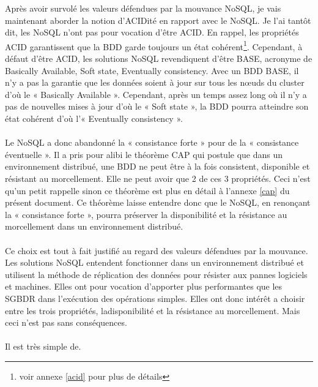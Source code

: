 Après avoir survolé les valeurs défendues par la mouvance \textsf{NoSQL}, je vais maintenant aborder la notion d'\textsf{ACIDité} en rapport avec le \textsf{NoSQL}. Je l'ai tantôt dit, les \textsf{NoSQL} n'ont pas pour vocation d'être \textsf{ACID}. En rappel, les propriétés \textsf{ACID} garantissent que la \textsf{BDD} garde toujours un état cohérent\footnote{voir annexe \ref{acid} pour plus de détails}. Cependant, à défaut d'être \textsf{ACID}, les solutions \textsf{NoSQL} revendiquent d'être \textsf{BASE}\cite{RickCattell}, acronyme de \textsf{Basically Available, Soft state, Eventually consistency}. Avec un \textsf{BDD BASE}, il n'y a pas la garantie que les données soient à jour sur tous les nœuds du cluster d'où le « \textsf{Basically Available} ». Cependant, après un temps assez long où il n'y a pas de nouvelles mises à jour d'où le « \textsf{Soft state} », la \textsf{BDD} pourra atteindre son état cohérent d'où l'« \textsf{Eventually consistency} ». 
\\
\\
Le \textsf{NoSQL} a donc abandonné la « consistance forte » pour de la « consistance éventuelle ». Il a pris pour alibi le théorème \textsf{CAP} qui postule que dans un environnement distribué, une \textsf{BDD} ne peut être à la fois consistent, disponible  et résistant au morcellement. Elle ne peut avoir que 2 de ces 3 propriétés. Ceci n'est qu'un petit rappelle sinon ce théorème 
est plus en détail à l'annexe \ref{cap} du présent document\cite{MichaelStonebraker2}. Ce théorème laisse entendre donc que le \textsf{NoSQL}, en renonçant la « consistance forte », pourra préserver la \textsf{disponibilité}  et la \textsf{résistance au morcellement} dans un environnement distribué. 
\\
\\
Ce choix est tout à fait justifié au regard des valeurs défendues par la mouvance. Les solutions \textsf{NoSQL} entendent fonctionner dans un environnement distribué et utilisent la méthode de réplication des données pour résister aux pannes logiciels et machines. Elles ont pour vocation d'apporter plus performantes que les \textsf{SGBDR} dans l'exécution des opérations simples. Elles ont donc intérêt a choisir entre les trois propriétés, la\textsf{disponibilité}  et la \textsf{résistance au morcellement}. Mais ceci n'est pas sans conséquences.
\\
\\
Il est très simple de.
